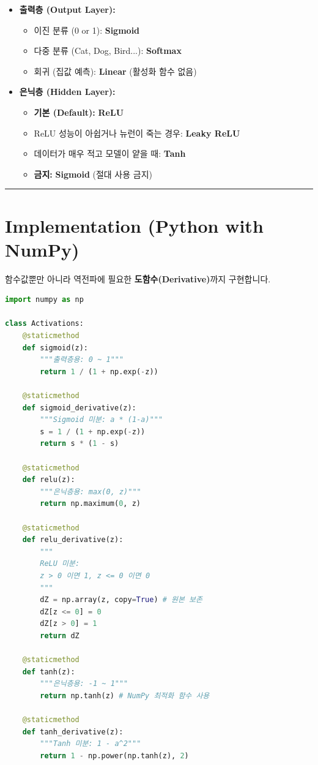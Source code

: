 \documentclass[11pt,a4paper]{book}
\theoremstyle{definition}
\begin{document}
\begin{tcolorbox}[colback=white, colframe=black, title=활성화 함수 선택 가이드]
\begin{itemize}
    \item \textbf{출력층 (Output Layer):}
    \begin{itemize}
        \item 이진 분류 (0 or 1): \textbf{Sigmoid}
        \item 다중 분류 (Cat, Dog, Bird...): \textbf{Softmax}
        \item 회귀 (집값 예측): \textbf{Linear} (활성화 함수 없음)
    \end{itemize}
    
    \item \textbf{은닉층 (Hidden Layer):}
    \begin{itemize}
        \item \textbf{기본 (Default):} \textbf{ReLU}
        \item ReLU 성능이 아쉽거나 뉴런이 죽는 경우: \textbf{Leaky ReLU}
        \item 데이터가 매우 적고 모델이 얕을 때: \textbf{Tanh}
        \item \textbf{금지:} \textbf{Sigmoid} (절대 사용 금지)
    \end{itemize}
\end{itemize}
\end{tcolorbox}

\vspace{0.5cm}\hrule\vspace{0.5cm}

\section{Implementation (Python with NumPy)}

함수값뿐만 아니라 역전파에 필요한 \textbf{도함수(Derivative)}까지 구현합니다.

\begin{lstlisting}[language=Python, caption=Activation Functions \& Derivatives, breaklines=true]
import numpy as np

class Activations:
    @staticmethod
    def sigmoid(z):
        """출력층용: 0 ~ 1"""
        return 1 / (1 + np.exp(-z))
    
    @staticmethod
    def sigmoid_derivative(z):
        """Sigmoid 미분: a * (1-a)"""
        s = 1 / (1 + np.exp(-z))
        return s * (1 - s)

    @staticmethod
    def relu(z):
        """은닉층용: max(0, z)"""
        return np.maximum(0, z)

    @staticmethod
    def relu_derivative(z):
        """
        ReLU 미분:
        z > 0 이면 1, z <= 0 이면 0
        """
        dZ = np.array(z, copy=True) # 원본 보존
        dZ[z <= 0] = 0
        dZ[z > 0] = 1
        return dZ

    @staticmethod
    def tanh(z):
        """은닉층용: -1 ~ 1"""
        return np.tanh(z) # NumPy 최적화 함수 사용

    @staticmethod
    def tanh_derivative(z):
        """Tanh 미분: 1 - a^2"""
        return 1 - np.power(np.tanh(z), 2)
\end{lstlisting}
\end{document}
